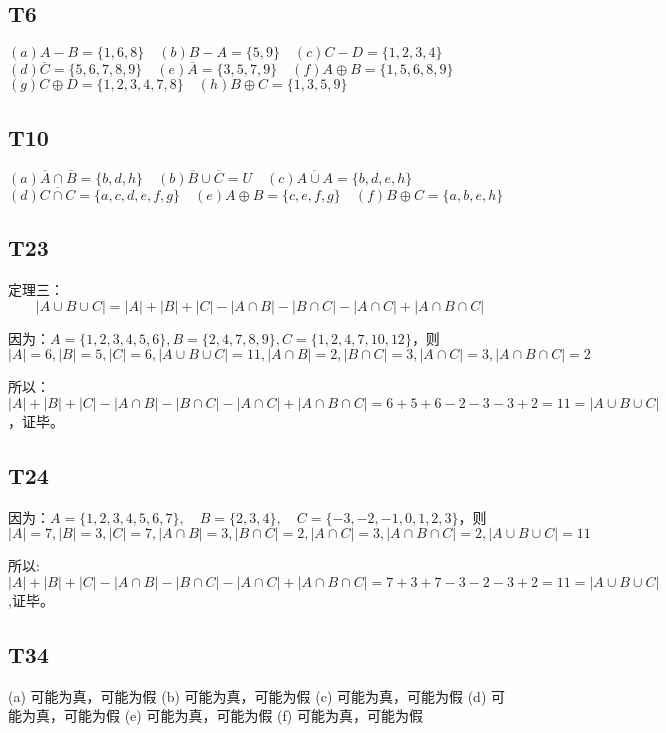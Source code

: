 \documentclass{article}
\begin{document}
\subsection{T6}\noindent
$(a) A - B = \{1, 6, 8\} \quad (b) B - A = \{5, 9\} \quad (c) C - D = \{1, 2, 3, 4\}$\\
$(d) \overline{C} = \{5, 6, 7, 8, 9\} \quad (e)\overline{A} = \{3, 5, 7, 9\} \quad (f) A \oplus B = \{1, 5, 6, 8, 9\}$\\
$(g) C \oplus D = \{1, 2, 3, 4, 7, 8\} \quad (h) B \oplus C = \{1, 3, 5, 9\}$

\subsection{T10}\noindent
$(a) \overline{A} \cap \overline{B} = \{b, d, h\} \quad (b) \overline{B} \cup \overline{C} = U \quad (c) \overline{A \cup A} = \{b, d, e, h\}$\\
$(d) \overline{C \cap C} = \{a, c, d, e, f, g\} \quad (e) A \oplus B = \{c, e, f, g\} \quad (f) B \oplus C = \{a, b, e, h\}$

\subsection{T23}
定理三：
\[
    |A \cup B \cup C| = |A| + |B| + |C| - |A \cap B| - |B \cap C| - |A \cap C| + |A \cap B \cap C|
\]

因为：$A = \{1, 2, 3, 4, 5, 6\}, B = \{2, 4, 7, 8, 9\}, C = \{1, 2, 4, 7, 10, 12\}$，则
\(|A| = 6, |B| = 5, |C| = 6, |A \cup B \cup C| = 11, |A \cap B| = 2, |B \cap C| = 3, 
|A \cap C| = 3, |A \cap B \cap C| = 2\)

所以：\(|A| + |B| + |C| - |A \cap B| - |B \cap C| - |A \cap C| + |A \cap B \cap C|
= 6 + 5 + 6 - 2 - 3 - 3 + 2 = 11 = |A \cup B \cup C|\)，证毕。

\subsection{T24}
因为：$A = \{1, 2, 3, 4, 5, 6, 7\}, \quad B = \{2, 3, 4\}, \quad C = \{-3, -2, -1, 0, 1, 2, 3\}$，则
\(|A| = 7, |B| = 3, |C| = 7, |A \cap B| = 3, |B \cap C| = 2, |A \cap C| = 3, |A \cap B \cap C| = 2,
|A \cup B \cup C| = 11\)

所以:\(|A| + |B| + |C| - |A \cap B| - |B \cap C| - |A \cap C| + |A \cap B \cap C|
= 7 + 3 + 7 - 3 - 2 - 3 + 2 = 11 = |A \cup B \cup C|\),证毕。

\subsection{T34}
(a) 可能为真，可能为假 \quad (b) 可能为真，可能为假 \quad (c) 可能为真，可能为假 \quad
(d) 可能为真，可能为假 \quad (e) 可能为真，可能为假 \quad (f) 可能为真，可能为假
\end{document}
